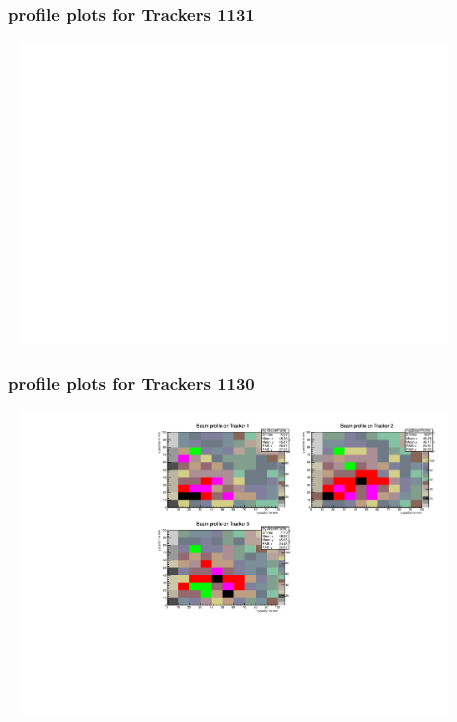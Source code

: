 \documentclass[slidestop,compress,mathserif]{beamer}
\begin{document}
\begin{frame}\frametitle{profile plots for Trackers 1131}
	 \includegraphics[width=12cm,height=8cm]{profile_plots_for_Trackers_1131.pdf}
\end{frame}
\begin{frame}\frametitle{profile plots for Trackers 1130}
	 \includegraphics[width=12cm,height=8cm]{profile_plots_for_Trackers_1130.pdf}
\end{frame}
\end{document}
